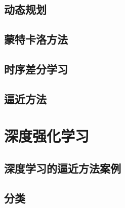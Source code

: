 \subsection{动态规划}


\subsection{蒙特卡洛方法}


\subsection{时序差分学习}

\subsection{逼近方法}

\section{深度强化学习}

\subsection{深度学习的逼近方法案例}

\subsection{分类}


